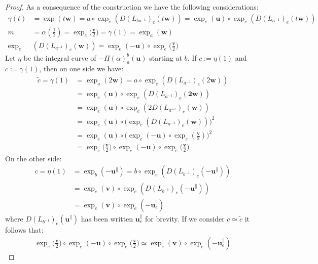 \begin{proof}
	As a consequence of the construction we have the following considerations:
	\begin{align*}
	\gamma(t) &= \exp(t\mathbf{w}) 
	= 
	a \circ \exp_{e}(D(L_{ba^{-1}})_{e}(t\mathbf{w})) 
	= 
	\exp_{e}(\mathbf{u})  \circ \exp_{e}(D(L_{a^{-1}})_{e}(t\mathbf{w})) 
	\\
	m &= \alpha(\frac{1}{2}) 
	= \exp_{e}\big(\frac{\mathbf{v}}{2}\big) = \gamma(1) = \exp_{a}(\mathbf{w})
	\\
	\exp_{e}&(D(L_{a^{-1}})_{e}(\mathbf{w})) = \exp_{e}(-\mathbf{u}) \circ  \exp_{e}\big(\frac{\mathbf{v}}{2}\big) 
	\end{align*}
	Let $\eta$ be the integral curve of  $-\Pi(\alpha)_{a}^{b}(\mathbf{u})$ starting at $b$. If $c := \eta(1)$ and $\tilde{c} := \gamma(1)$, then on one side we have:
	\begin{align*}
	\tilde{c} = \gamma(1) &= \exp_a(2\mathbf{w}) = a \circ\exp_{e}(D(L_{a^{-1}})_{e}(2\mathbf{w})) \\
	&= \exp_{e}(\mathbf{u})\circ\exp_{e}(D(L_{a^{-1}})_{e}(\mathbf{2w})) \\
	&= \exp_{e}(\mathbf{u})\circ\exp_{e}(2D(L_{a^{-1}})_{e}(\mathbf{w})) \\
	&= \exp_{e}(\mathbf{u})\circ \big(\exp_{e}(D(L_{a^{-1}})_{e}(\mathbf{w})) \big)^2\\
	&=  \exp_{e}(\mathbf{u})\circ \big(  \exp_{e}(-\mathbf{u}) \circ  \exp_{e}(\frac{\mathbf{v}}{2}) \big)^2\\
	&=   \exp_{e}\big(\frac{\mathbf{v}}{2}\big)   
	\circ  \exp_{e}(-\mathbf{u}) 
	\circ \exp_{e}\big(\frac{\mathbf{v}}{2}\big) 
	\end{align*}
	On the other side:
	\begin{align*}
	c = \eta(1) &= \exp_{b}(-\mathbf{u}^{\parallel}) = b \circ\exp_{e}(D(L_{b^{-1}})_{e}(-\mathbf{u}^{\parallel})) \\
	&= \exp_{e}(\mathbf{v}) \circ\exp_{e}(D(L_{b^{-1}})_{e}(-\mathbf{u}^{\parallel})) \\
	&= \exp_{e}(\mathbf{v}) \circ\exp_{e}(-\mathbf{u}_{e}^{\parallel}) 
	\end{align*}
	where $D(L_{b^{-1}})_{e}(\mathbf{u}^{\parallel})$ has been written $\mathbf{u}_{e}^{\parallel}$ for brevity.
	If we consider $c\simeq \tilde{c}$ it follows that:
	\begin{align*}
	\exp_{e}\big(\frac{\mathbf{v}}{2}\big)   
	\circ  \exp_{e}(-\mathbf{u}) 
	\circ \exp_{e}\big(\frac{\mathbf{v}}{2}\big)
	\simeq
	\exp_{e}(\mathbf{v}) \circ\exp_{e}(-\mathbf{u}_{e}^{\parallel}) 

\end{align*}
\end{proof}
